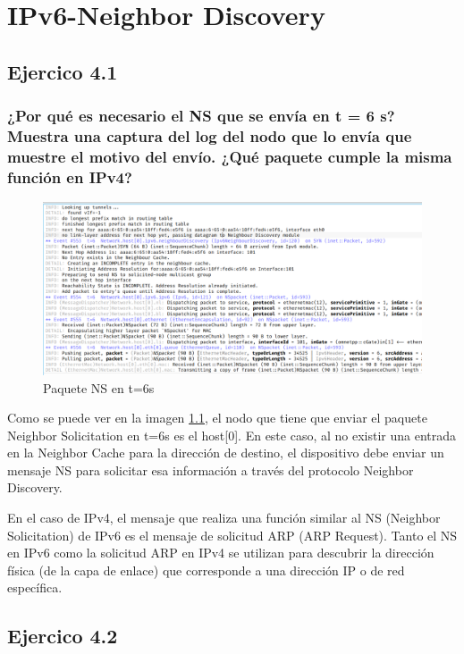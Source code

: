 \chapter{IPv6-Neighbor Discovery}
\label{chap:ipv6_nd}

\section{Ejercico 4.1}
\subsection{¿Por qué es necesario el NS que se envía en t = 6 s? Muestra una captura del log del nodo que lo envía que muestre el motivo del envío. ¿Qué paquete cumple la misma función en IPv4?}

\begin{figure}[H]
    \centering
    \includegraphics[width=135mm, scale=0.75]{imaxes/captura_ejer4_1.png}
    \caption{Paquete NS en t=6s}
    \label{fig:paquete_ns_t6}
\end{figure}

Como se puede ver en la imagen \ref{fig:paquete_ns_t6}, el nodo que tiene que enviar el paquete Neighbor Solicitation en t=6s es el host[0]. En este caso, al no existir una entrada en la Neighbor Cache para la dirección de destino, el dispositivo debe enviar un mensaje NS para solicitar esa información a través del protocolo Neighbor Discovery.


En el caso de IPv4, el mensaje que realiza una función similar al NS (Neighbor Solicitation) de IPv6 es el mensaje de solicitud ARP (ARP Request). Tanto el NS en IPv6 como la solicitud ARP en IPv4 se utilizan para descubrir la dirección física (de la capa de enlace) que corresponde a una dirección IP o de red específica.

\section{Ejercico 4.2}
